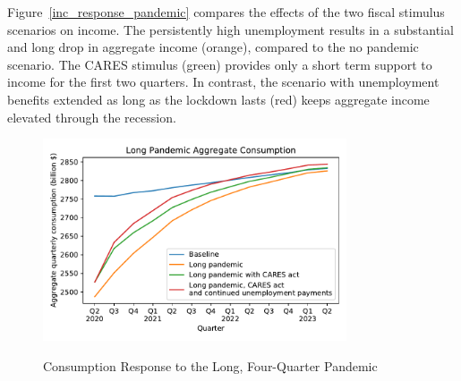 \documentclass[titlepage,a4paper]{\econtex}
\begin{document}
Figure~\ref{inc_response_pandemic} compares the effects of the two fiscal stimulus scenarios on income.
The persistently high unemployment results in a substantial and long drop in aggregate income (orange), compared to the no pandemic scenario.
The CARES stimulus (green) provides only a short term support to income for the first two quarters.
In contrast, the scenario with unemployment benefits extended as long as the lockdown lasts (red) keeps aggregate income elevated through the recession.

\begin{figure}
  \centering
  \caption{Consumption Response to the Long, Four-Quarter Pandemic}
  \label{cons_response_pandemic}
  { \includegraphics[width=0.8\textwidth]{./Figures/DeepPandemic}}
\end{figure}
\end{document}
